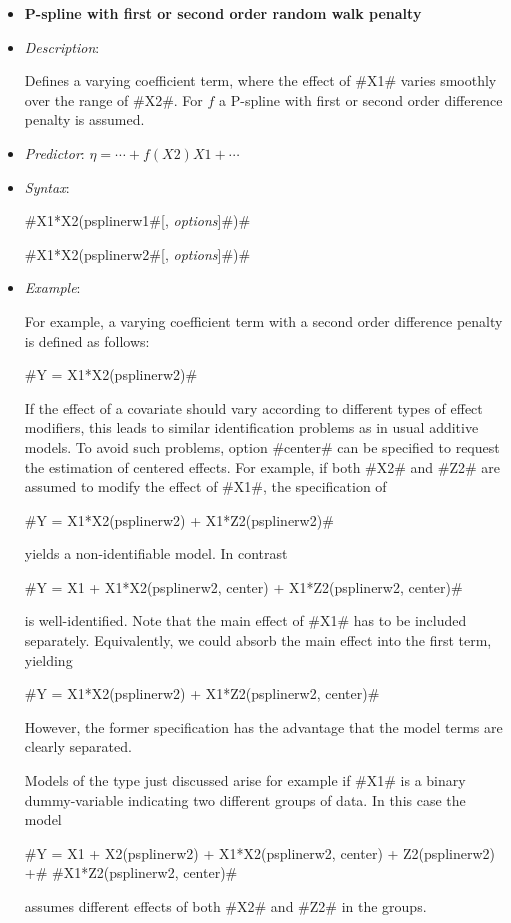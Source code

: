 \begin{itemize}
\item[]{\bf\sffamily P-spline with first or second order random
walk penalty}

\item[] {\em Description}:

Defines a varying coefficient term, where the effect of #X1#
varies smoothly over the range of #X2#.  For
$f$ a P-spline with first or second order difference  penalty is assumed.
\item[] {\em Predictor}: $\eta= \cdots + f(X2)X1 + \cdots$ \item[]
{\em Syntax}:

#X1*X2(psplinerw1#[, {\em options}]#)#

#X1*X2(psplinerw2#[, {\em options}]#)#
\item[] {\em Example}:

For example, a varying coefficient term with a second order difference penalty
is defined as follows:

#Y = X1*X2(psplinerw2)#

If the effect of a covariate should vary according to different
types of effect modifiers, this leads to similar identification
problems as in usual additive models. To avoid such problems,
option #center# can be specified to request the estimation of
centered effects. For example, if both #X2# and #Z2# are assumed
to modify the effect of #X1#, the specification of

#Y = X1*X2(psplinerw2) + X1*Z2(psplinerw2)#

yields a non-identifiable model. In contrast

#Y = X1 + X1*X2(psplinerw2, center) + X1*Z2(psplinerw2, center)#

is well-identified. Note that the main effect of #X1# has to be
included separately. Equivalently, we could absorb the main effect
into the first term, yielding

#Y = X1*X2(psplinerw2) + X1*Z2(psplinerw2, center)#

However, the former specification has the advantage that the model
terms are clearly separated.

Models of the type just discussed arise for example if #X1# is a
binary dummy-variable indicating two different groups of data. In
this case the model

 #Y = X1 + X2(psplinerw2) + X1*X2(psplinerw2, center) + Z2(psplinerw2) +#
 #X1*Z2(psplinerw2, center)#

assumes different effects of both #X2# and #Z2# in the groups.


\end{itemize}
